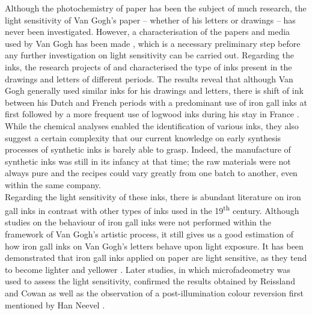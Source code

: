 Although the photochemistry of paper has been the subject of much research, the light sensitivity of Van Gogh's paper – whether of his letters or drawings – has never been investigated. However, a characterisation of the papers and media used by Van Gogh has been made \citep{ives_vincent_2005, vellekoop_vincent_2007}, which is a necessary preliminary step before any further investigation on light sensitivity can be carried out. Regarding the inks, the research projects of \citet{neevel_non-invasive_2008} and \citet{neevel_identification_2013} characterised the type of inks present in the drawings and letters of different periods. The results reveal that although Van Gogh generally used similar inks for his drawings and letters, there is shift of ink between his Dutch and French periods with a predominant use of iron gall inks at first followed by a more frequent use of logwood inks during his stay in France \citep[Figures 10 and 11]{neevel_identification_2013}. While the chemical analyses enabled the identification of various inks, they also suggest a certain complexity that our current knowledge on early synthesis processes of synthetic inks is barely able to grasp. Indeed, the manufacture of synthetic inks was still in its infancy at that time; the raw materials were not always pure and the recipes could vary greatly from one batch to another, even within the same company.\\

Regarding the light sensitivity of these inks, there is abundant literature on iron gall inks in contrast with other types of inks used in the 19\textsuperscript{th} century. Although studies on the behaviour of iron gall inks were not performed within the framework of Van Gogh's artistic process, it still gives us a good estimation of how iron gall inks on Van Gogh's letters behave upon light exposure. It has been demonstrated that iron gall inks applied on paper are light sensitive, as they tend to become lighter and yellower \citep[181-2]{reissland_light_2002}. Later studies, in which microfadeometry was used to assess the light sensitivity, confirmed the results obtained by Reissland and Cowan \citep{tse_microfade_2010} as well as the observation of a post-illumination colour reversion first mentioned by Han Neevel \citep{ford_accelerated_2014}.\\

